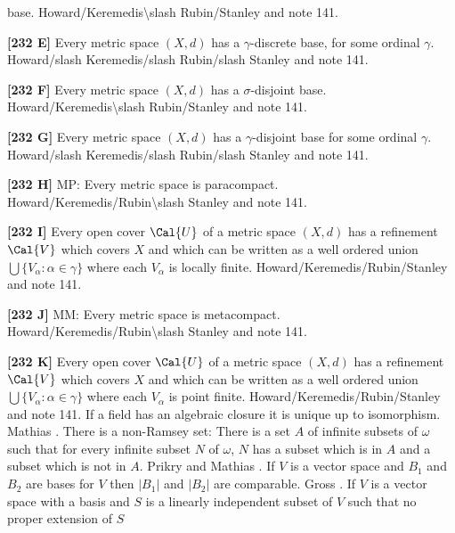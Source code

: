 base. \ac{Howard/Keremedis\slash Rubin/Stanley} \cite{1999} and note 141.
\smallskip
\item{}{\bf [232 E]}  Every metric space $(X,d)$ has a $\gamma$-discrete
base, for some ordinal $\gamma$. \ac{Howard/slash Keremedis/slash
Rubin/slash Stanley} \cite{1999} and note 141.
\smallskip
\item{}{\bf [232 F]} Every metric space $(X,d)$ has a $\sigma$-disjoint
base. \ac{Howard/Keremedis\slash Rubin/Stanley} \cite{1999} and note 141.
\smallskip
\item{}{\bf [232 G]} Every metric space $(X,d)$ has a $\gamma$-disjoint
base for some ordinal $\gamma$. \ac{Howard/slash Keremedis/slash
Rubin/slash Stanley} \cite{1999} and note 141.
\smallskip
\item{}{\bf [232 H]} MP: Every metric space is paracompact.
\ac{Howard/Keremedis/Rubin\slash Stanley} \cite{1999} and note 141.
\smallskip
\item{}{\bf [232 I]} Every open cover $\Cal{U}$ of a metric space $(X,d)$
has a refinement $\Cal{V}$ which covers $X$ and which can be written as a
well ordered union $\bigcup \{V_\alpha :\alpha\in\gamma\}$ where each
$V_\alpha$ is locally finite. \ac{Howard/Keremedis/Rubin/Stanley}
\cite{1999} and note 141.
\smallskip
\item{}{\bf [232 J]} MM: Every metric space is metacompact.
\ac{Howard/Keremedis/Rubin\slash Stanley} \cite{1999} and note 141.
\smallskip
\item{}{\bf [232 K]} Every open cover $\Cal{U}$ of a metric space $(X,d)$
has a refinement $\Cal{V}$ which covers $X$ and which can be written as a
well ordered union $\bigcup \{V_\alpha :\alpha\in\gamma\}$ where each
$V_\alpha $ is point finite. \ac{Howard/Keremedis/Rubin/Stanley}
\cite{1999} and note 141.
\medskip
{} If a field has an algebraic closure it is unique
up to isomorphism. \ac{Mathias} \cite{1977b}. 
\medskip
{} There is a non-Ramsey set: There is a set $A$ of
infinite subsets of $\omega$ such that for every infinite subset $N$ of
$\omega$, $N$ has a subset which is in $A$ and a subset which is not
in $A$.  \ac{Prikry} \cite{1976} and \ac{Mathias} \cite{1968}.
\medskip
{} If $V$ is a vector space and $B_{1}$ and $B_{2}$
are bases for $V$ then $|B_{1}|$ and $|B_{2}|$ are comparable. \ac{Gross}
\cite{1976}.
\medskip
{} If $V$ is a vector space with a basis and $S$ is
a linearly independent subset of $V$ such that no proper extension of $S$
